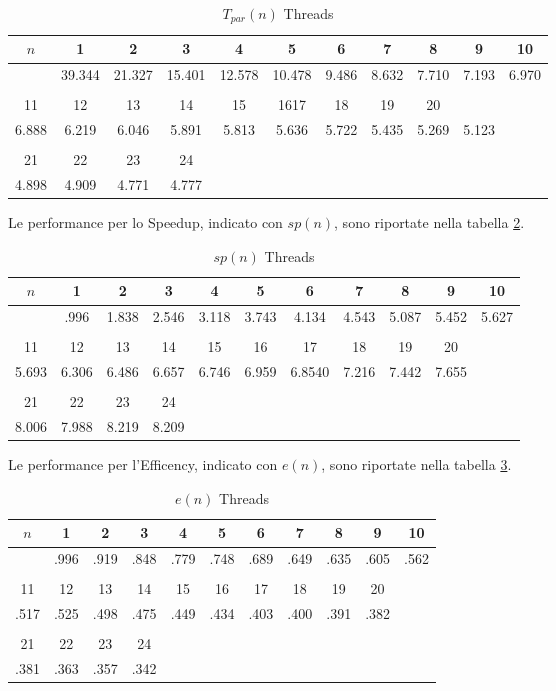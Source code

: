 \documentclass[12pt]{article}
\begin{document}
\begin{table}[!htbp]
\centering
\caption{$T_{par}(n)$ Threads}
\label{fftc1}
\begin{tabular}{c c c c c c c c c c c }
$n$ & 1 & 2 & 3 & 4 & 5 & 6 & 7 & 8 & 9 & 10   \\ \hline
& 39.344 & 21.327  & 15.401 &  12.578 & 10.478 & 9.486 & 8.632 & 7.710 & 7.193 & 6.970 
  \\ \\
11 & 12 & 13 & 14 & 15 & 1617 & 18 & 19 & 20 \\ \hline
6.888 & 6.219 & 6.046 & 5.891 & 5.813 & 5.636 & 5.722 & 5.435 & 5.269  & 5.123 
  \\ \\
21 & 22 & 23 & 24 \\ \hline
 4.898 & 4.909 & 4.771 & 4.777 
\end{tabular}
\end{table}
Le performance per lo Speedup, indicato con $sp(n)$, sono riportate nella tabella \ref{ffsp1}.
\begin{table}[!htbp]
\centering
\caption{$sp(n)$ Threads}
\label{ffsp1}
\begin{tabular}{c c c c c c c c c c c }
$n$ & 1 & 2 & 3 & 4 & 5 & 6 & 7 & 8 & 9 & 10   \\ \hline
& .996 & 1.838 & 2.546 & 3.118 & 3.743 & 4.134 & 4.543 & 5.087 & 5.452 & 5.627
  \\ \\
11 & 12 & 13 & 14 & 15 & 16 & 17 & 18 & 19 & 20 \\ \hline
5.693 & 6.306 & 6.486 & 6.657 & 6.746 & 6.959 & 6.8540 & 7.216 & 7.442 & 7.655
  \\ \\
21 & 22 & 23 & 24 \\ \hline
8.006 & 7.988 & 8.219 & 8.209
\end{tabular}
\end{table}

Le performance per l'Efficency, indicato con $e(n)$, sono riportate nella tabella \ref{ffef1}.
\begin{table}[!htbp]
\centering
\caption{$e(n)$ Threads}
\label{ffef1}
\begin{tabular}{c c c c c c c c c c c }
$n$ & 1 & 2 & 3 & 4 & 5 & 6 & 7 & 8 & 9 & 10   \\ \hline
& .996 & .919 & .848 & .779 & .748 & .689 & .649 & .635 & .605 & .562 
  \\ \\
11 & 12 & 13 & 14 & 15 & 16 & 17 & 18 & 19 & 20 \\ \hline
.517 & .525 & .498 & .475 & .449 & .434 & .403 & .400 & .391 & .382
  \\ \\
21 & 22 & 23 & 24 \\ \hline
.381 & .363 & .357 & .342
\end{tabular}
\end{table}
\end{document}
